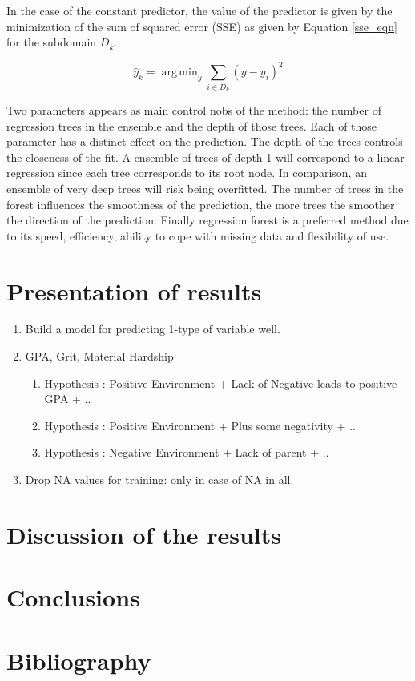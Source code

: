 \documentclass{article} %
\DeclareMathOperator*{\argmin}{arg\,min}
\begin{document}
In the case of the constant predictor, the value of the predictor is given by the minimization of the sum of squared error (SSE) as given by Equation \ref{sse_eqn} for the subdomain $D_k$. 

\begin{equation} \label{sse_eqn}
\hat{y}_k = \argmin_y \sum_{i \in D_k} (y-y_i)^2
\end{equation}

Two parameters appears as main control nobs of the method: the number of regression trees in the ensemble and the depth of those trees. Each of those parameter has a distinct effect on the prediction. The depth of the trees controls the closeness of the fit. A ensemble of trees of depth 1 will correspond to a linear regression since each tree corresponds to its root node. In comparison, an ensemble of very deep trees will risk being overfitted. The number of trees in the forest influences the smoothness of the prediction, the more trees the smoother the direction of the prediction. 
Finally regression forest is a preferred method due to its speed, efficiency, ability to cope with missing data and flexibility of use. 
\section{Presentation of results}

\begin{enumerate}
	\item Build a model for predicting 1-type of variable well.
	\item GPA, Grit, Material Hardship
	\begin{enumerate}
		\item Hypothesis : Positive Environment + Lack of Negative leads to positive GPA + ..
		\item Hypothesis : Positive Environment + Plus some negativity + ..
		\item Hypothesis : Negative Environment + Lack of parent + ..
	\end{enumerate}
	\item Drop NA values for training: only in case of NA in all.
\end{enumerate}
\section{Discussion of the results}
\section{Conclusions}
\section{Bibliography}


\end{document}
